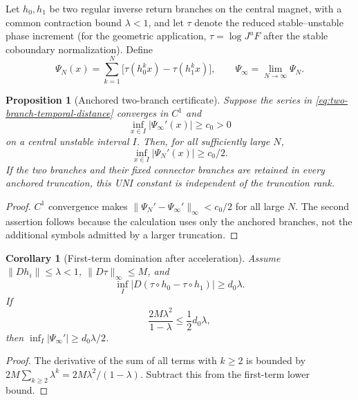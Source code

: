 \documentclass[11pt]{article}
\newtheorem{proposition}[theorem]{Proposition}
\newtheorem{corollary}[theorem]{Corollary}
\begin{document}
Let $h_0,h_1$ be two regular inverse return branches on the central magnet,
with a common contraction bound $\lambda<1$, and let $\tau$ denote the
reduced stable--unstable phase increment (for the geometric application,
$\tau=\log J^uF$ after the stable coboundary normalization).  Define
\begin{equation}
\label{eq:two-branch-temporal-distance}
 \Psi_N(x)=\sum_{k=1}^N
 \bigl[\tau(h_0^kx)-\tau(h_1^kx)\bigr],
 \qquad
 \Psi_\infty=\lim_{N\to\infty}\Psi_N .
\end{equation}

\begin{proposition}[Anchored two-branch certificate]
\label{prop:two-branch-uni}
Suppose the series in \eqref{eq:two-branch-temporal-distance} converges in
$C^1$ and
\[
 \inf_{x\in I}|\Psi_\infty'(x)|\ge c_0>0
\]
on a central unstable interval $I$.  Then, for all sufficiently large $N$,
\[
 \inf_{x\in I}|\Psi_N'(x)|\ge c_0/2.
\]
If the two branches and their fixed connector branches are retained in every
anchored truncation, this UNI constant is independent of the truncation rank.
\end{proposition}

\begin{proof}
$C^1$ convergence makes
$\|\Psi_N'-\Psi_\infty'\|_\infty<c_0/2$ for all large $N$.  The second
assertion follows because the calculation uses only the anchored branches,
not the additional symbols admitted by a larger truncation.
\end{proof}

\begin{corollary}[First-term domination after acceleration]
\label{cor:first-term-uni}
Assume $\|Dh_i\|\le\lambda<1$, $\|D\tau\|_\infty\le M$, and
\[
 \inf_I|D(\tau\circ h_0-\tau\circ h_1)|\ge d_0\lambda .
\]
If
\[
 \frac{2M\lambda^2}{1-\lambda}\le\frac12d_0\lambda,
\]
then $\inf_I|\Psi_\infty'|\ge d_0\lambda/2$.
\end{corollary}

\begin{proof}
The derivative of the sum of all terms with $k\ge2$ is bounded by
$2M\sum_{k\ge2}\lambda^k=2M\lambda^2/(1-\lambda)$.  Subtract this from the
first-term lower bound.
\end{proof}
\end{document}
